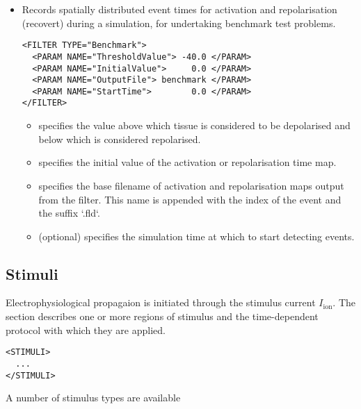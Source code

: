 \begin{itemize}
\item {} Records spatially distributed event times for 
    activation and repolarisation (recovert) during a simulation, for
    undertaking benchmark test problems.
\begin{lstlisting}[style=XmlStyle]
<FILTER TYPE="Benchmark">
  <PARAM NAME="ThresholdValue"> -40.0 </PARAM>
  <PARAM NAME="InitialValue">     0.0 </PARAM>
  <PARAM NAME="OutputFile"> benchmark </PARAM>
  <PARAM NAME="StartTime">        0.0 </PARAM>
</FILTER>
\end{lstlisting}
    \begin{itemize}
        \item {} specifies the value above which tissue is
            considered to be depolarised and below which is considered
            repolarised.
        \item {} specifies the initial value of the
            activation or repolarisation time map.
        \item {} specifies the base filename of activation and
            repolarisation maps output from the filter. This name is appended
            with the index of the event and the suffix `.fld`.
        \item {} (optional) specifies the simulation time at
            which to start detecting events.
    \end{itemize}
\end{itemize}


\subsection{Stimuli}
Electrophysiological propagaion is initiated through the stimulus current 
$I_{\mathrm{ion}}$. The  section describes one or more regions of
stimulus and the time-dependent protocol with which they are applied.
\begin{lstlisting}[style=XmlStyle]
<STIMULI>
  ...
</STIMULI>
\end{lstlisting}
A number of stimulus types are available

